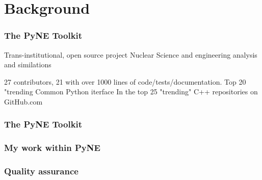 \documentclass[12pt]{beamer}
\begin{document}
\section{Background}
\begin{frame}[fragile]
\frametitle{The PyNE Toolkit}

Trans-institutional, open source project
Nuclear Science and engineering analysis and similations

27 contributors, 21 with over 1000 lines of code/tests/documentation.
Top 20 "trending 
Common Python iterface
In the top 25 "trending" C++ repositories on GitHub.com

\end{frame}
\begin{frame}[fragile]
\frametitle{The PyNE Toolkit}

\end{frame}
\begin{frame}
\frametitle{My work within PyNE}

\end{frame}
\begin{frame}[fragile]
\frametitle{Quality assurance}

\end{frame}
\end{document}

